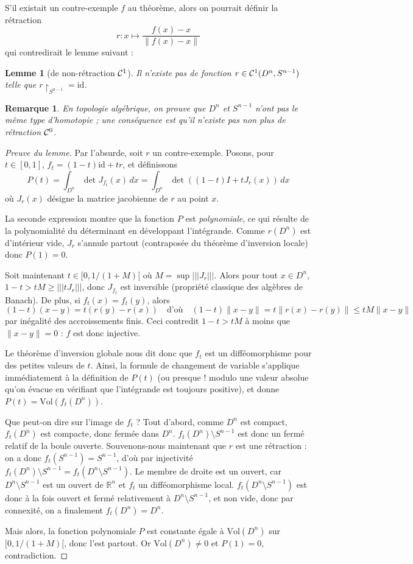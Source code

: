 \documentclass[a4paper, 11pt]{article}
\def\R{\mathbb{R}}
\def\Cf{{\cal{C}}}
\def\Vol{\mathrm{Vol}}
\newtheorem*{lemma}{Lemme}
\newtheorem*{remark}{Remarque}
\begin{document}
S'il existait un contre-exemple $f$ au théorème, alors on pourrait définir la
rétraction
\[ r : x \mapsto \frac{f(x) - x}{\|f(x) - x\|}\]
qui contredirait le lemme suivant :

\begin{lemma}[de non-rétraction $\Cf^1$]
  Il n'existe pas de fonction $r \in \Cf^1(D^n, S^{n-1})$ telle que
  $r\restriction_{S^{n-1}} = \mathrm{id}$.
\end{lemma}
\begin{remark}
En topologie algébrique, on prouve que $D^n$ et $S^{n-1}$ n'ont pas le même type
d'homotopie ; une conséquence est qu'il n'existe pas non plus de rétraction
$\Cf^0$.
\end{remark}

\begin{proof}[Preuve du lemme]
  Par l'absurde, soit $r$ un contre-exemple.  
  Posons, pour $t \in [0,1]$, $f_t = (1-t)\mathrm{id} + tr$, et définissons
  \[ P(t) = \int_{D^n} \det J_{f_t}(x)\,dx = \int_{D^n} \det ((1-t)I +
    tJ_r(x))\,dx \]
  où $J_r(x)$ désigne la matrice jacobienne de $r$ au point $x$.

  La seconde expression montre que la fonction $P$ est \emph{polynomiale}, ce
  qui résulte de la polynomialité du déterminant en développant l'intégrande.
  Comme $r(D^n)$ est d'intérieur vide, $J_r$ s'annule partout (contraposée du
  théorème d'inversion locale) donc $P(1) = 0$.

  Soit maintenant $t \in [0,1/(1+M)[$ où $M = \sup |||J_r|||$. Alors pour tout
  $x \in D^n$, $1-t > tM \geq |||tJ_r|||$, donc $J_{f_t}$ est inversible
  (propriété classique des algèbres de Banach). De plus, si $f_t(x) = f_t(y)$,
  alors
  \[(1-t)(x-y) = t(r(y) - r(x)) \quad \text{d'où} \quad
    (1-t)\|x-y\| = t\|r(x) - r(y)\| \leq tM\|x-y\| \]
  par inégalité des accroissements finis. Ceci contredit $1-t > tM$
  à moins que $\|x-y\| = 0$ : $f$ est donc injective.

  Le théorème d'inversion globale nous dit donc que $f_t$ est un difféomorphisme
  pour des petites valeurs de $t$. Ainsi, la formule de changement de variable
  s'applique immédiatement à la définition de $P(t)$ (ou presque ! modulo une
  valeur absolue qu'on évacue en vérifiant que l'intégrande est toujours
  positive), et donne $P(t) = \Vol(f_t(D^n))$.

  Que peut-on dire sur l'image de $f_t$ ? Tout d'abord, comme $D^n$ est compact,
  $f_t(D^n)$ est compacte, donc fermée dans $D^n$. $f_t(D^n)\setminus S^{n-1}$
  est donc un fermé relatif de la boule ouverte. Souvenons-nous maintenant que
  $r$ est une rétraction : on a donc $f_t(S^{n-1}) = S^{n-1}$, d'où par
  injectivité $f_t(D^n)\setminus S^{n-1} = f_t(D^n \setminus S^{n-1})$. Le
  membre de droite est un ouvert, car $D^n \setminus S^{n-1}$ est un ouvert de
  $\R^n$ et $f_t$ un difféomorphisme local. $f_t(D^n\setminus S^{n-1})$ est donc
  à la fois ouvert et fermé relativement à $D^n \setminus S^{n-1}$, et non vide,
  donc par connexité, on a finalement $f_t(D^n) = D^n$.

  Mais alors, la fonction polynomiale $P$ est constante égale à $\Vol(D^n)$ sur
  $[0,1/(1+M)[$, donc l'est partout. Or $\Vol(D^n) \neq 0$ et $P(1) = 0$,
  contradiction.
\end{proof}
\end{document}
